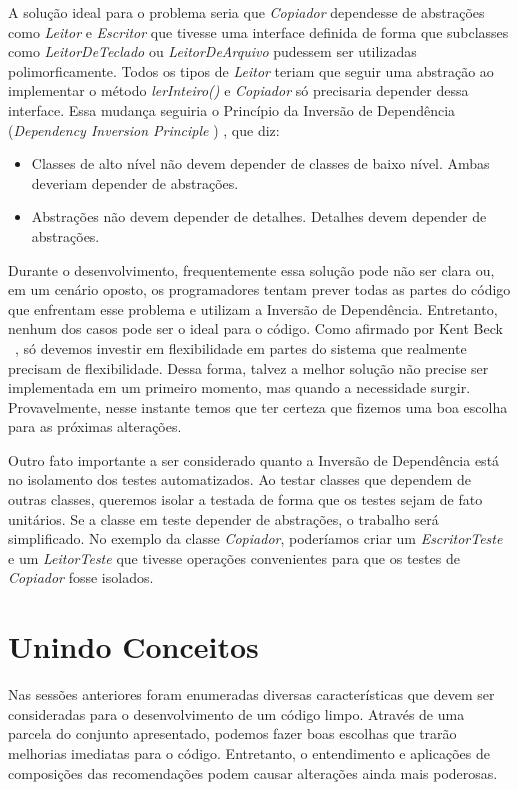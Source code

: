 A solução ideal para o problema seria que  \textit{Copiador} dependesse de abstrações como \textit{Leitor} e  \textit{Escritor} que tivesse uma interface definida de forma que subclasses como  \textit{LeitorDeTeclado} ou  \textit{LeitorDeArquivo} pudessem ser utilizadas polimorficamente. Todos os tipos de  \textit{Leitor} teriam que seguir uma abstração ao implementar o método  \textit{lerInteiro()} e  \textit{Copiador} só precisaria depender dessa interface. Essa mudança seguiria o Princípio da Inversão de Dependência (\textit{Dependency Inversion Principle} \citep{Martin97c}) , que diz:
	
\begin{itemize}
 	\item Classes de alto nível não devem depender de classes de baixo nível. Ambas deveriam depender de abstrações.
	\item Abstrações não devem depender de detalhes. Detalhes devem depender de abstrações.
\end{itemize}

Durante o desenvolvimento, frequentemente essa solução pode não ser clara ou, em um cenário oposto, os programadores tentam prever todas as partes do código que enfrentam esse problema e utilizam a Inversão de Dependência. Entretanto, nenhum dos casos pode ser o ideal para o código. Como afirmado por Kent Beck ~\citep{Beck2007}, só devemos investir em flexibilidade em partes do sistema que realmente precisam de flexibilidade. Dessa forma, talvez a melhor solução não precise ser implementada em um primeiro momento, mas quando a necessidade surgir. Provavelmente, nesse instante temos que ter certeza que fizemos uma boa escolha para as próximas alterações.

Outro fato importante a ser considerado quanto a Inversão de Dependência está no isolamento dos testes automatizados. Ao testar classes que dependem de outras classes, queremos isolar a testada de forma que os testes sejam de fato unitários. Se a classe em teste depender de abstrações, o trabalho será simplificado. No exemplo da classe \textit{Copiador}, poderíamos criar um \textit{EscritorTeste} e um \textit{LeitorTeste} que tivesse operações convenientes para que os testes de \textit{Copiador} fosse isolados.


\section{Unindo Conceitos}
\label{unindo_conceitos}
Nas sessões anteriores foram enumeradas diversas características que devem ser consideradas para o desenvolvimento de 
um código limpo. Através de uma parcela do conjunto apresentado, podemos fazer boas escolhas que trarão melhorias 
imediatas para o código. Entretanto, o entendimento e aplicações de composições das recomendações podem causar 
alterações ainda mais poderosas.

